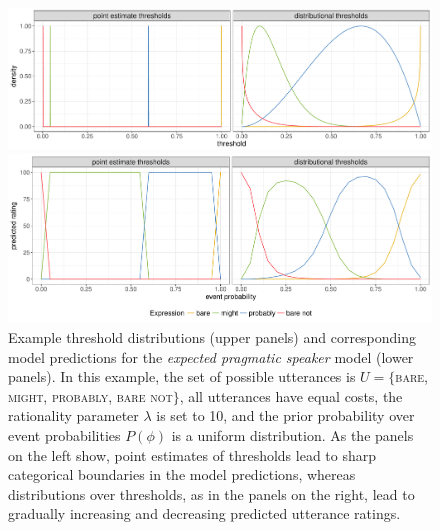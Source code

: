 \documentclass[man, floatsintext]{apa6}
\begin{document}
\begin{figure}[th!]
\includegraphics[width=\textwidth]{plots/model-visualization-distributions.pdf}

\includegraphics[width=\textwidth]{plots/model-visualization-predictions.pdf}

\caption{Example threshold distributions (upper panels) and corresponding model predictions for the \textit{expected pragmatic speaker} model (lower panels). In this example, the set of possible utterances is $U=\{$\textsc{bare}, \textsc{might}, \textsc{probably}, \textsc{bare not}$\}$, all utterances have equal costs, the rationality parameter $\lambda$ is set to 10, and the prior probability over event probabilities $P(\phi)$ is a uniform distribution. As the panels on the left show, point estimates of thresholds lead to sharp categorical boundaries in the model predictions, whereas distributions over thresholds, as in the panels on the right, lead to gradually increasing and decreasing predicted utterance ratings. \label{fig:model-visualization}}
\end{figure}
\end{document}
